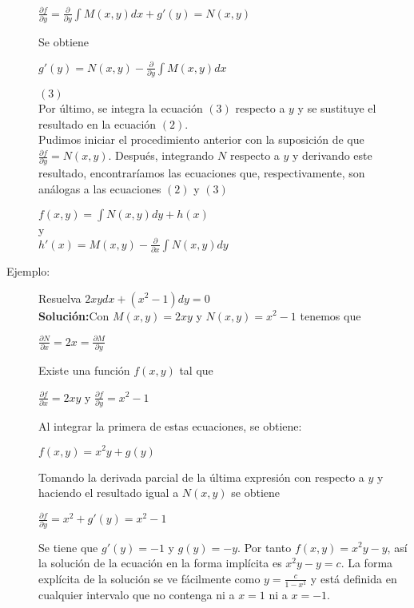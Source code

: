 \documentclass{article}
\begin{document}
\begin{description}
\begin{center}
    $\frac{\partial f}{\partial y} =\frac{\partial }{\partial y} \int M(x,y) dx + g'(y) = N(x, y)$
\end{center}
Se obtiene
\begin{center}
     $g'(y) = N(x, y) - \frac{\partial }{\partial y} \int M(x,y) dx$
\end{center}\tab$(3)$\\
Por último, se integra la ecuación $(3)$ respecto a $y$ y se sustituye el resultado en la ecuación $(2)$. \\
Pudimos iniciar  el procedimiento anterior con la suposición de que $ \frac{\partial f}{\partial y} = N(x,y) $. Después, integrando $N$ respecto a $y$ y derivando este resultado, encontraríamos las ecuaciones que, respectivamente, son análogas a las ecuaciones $(2)$ y $(3)$\\
\begin{center}
    $f(x,y) = \int N(x,y) dy + h(x)$\\y\\$h'(x) = M(x, y) - \frac{\partial }{\partial x} \int N(x,y) dy$ 
\end{center}
\item[Ejemplo:]
Resuelva $2xy dx + (x^2 - 1) dy = 0$\\
\textbf{Solución:}Con $M(x, y) = 2xy$ y $N(x, y) = x^2 - 1$ tenemos que\\
\begin{center}
    $\frac{\partial N}{\partial x}= 2x = \frac{\partial M}{\partial y}$
\end{center}
Existe una función $f(x, y)$ tal que
\begin{center}
    $\frac{\partial f}{\partial x} = 2xy$ y $\frac{\partial f}{\partial y} =  x^2 - 1$
\end{center}
Al integrar la primera de estas ecuaciones, se obtiene:
\begin{center}
    $f(x, y) = x^2y + g(y)$
\end{center}
Tomando la derivada parcial de la última expresión con respecto a $y$ y haciendo el resultado igual a $N(x, y)$ se obtiene
\begin{center}
    $\frac{\partial f}{\partial y} = x^2 + g'(y) = x^2 -1$
\end{center}
Se tiene que $g'(y) = -1$ y $g(y) = -y$. Por tanto $f(x, y) = x^2y - y$, así la solución de la ecuación en la forma implícita es 
$x^2y - y = c.$
La forma explícita de la solución se ve fácilmente como $y = \frac{c}{1-x^1}$ y está definida en cualquier intervalo que no contenga ni a $x = 1$ ni a $x = -1$. 
\end{description}
\printbibliography
\end{document}

